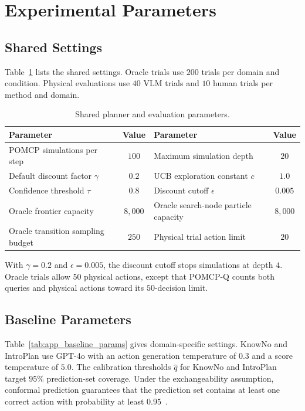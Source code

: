 \section{Experimental Parameters}\label{appx:settings}
\subsection{Shared Settings}\label{appx:planner_params}
Table~\ref{tab:app_planner_params} lists the shared settings. Oracle trials use $200$ trials per domain and condition. Physical evaluations use $40$ VLM trials and $10$ human trials per method and domain.

\begin{table}[!htbp]
\centering
\caption{Shared planner and evaluation parameters.}
\label{tab:app_planner_params}
\small
\begin{tabular*}{\textwidth}{@{\extracolsep{\fill}}lclc@{}}
\toprule
Parameter & Value & Parameter & Value \\
\midrule
POMCP simulations per step & $100$ & Maximum simulation depth & $20$ \\
Default discount factor $\gamma$ & $0.2$ & UCB exploration constant $c$ & $1.0$ \\
Confidence threshold $\tau$ & $0.8$ & Discount cutoff $\epsilon$ & $0.005$ \\
Oracle frontier capacity & $8{,}000$ & Oracle search-node particle capacity & $8{,}000$ \\
Oracle transition sampling budget & $250$ & Physical trial action limit & $20$ \\
\bottomrule
\end{tabular*}
\end{table}
With $\gamma=0.2$ and $\epsilon=0.005$, the discount cutoff stops simulations at depth $4$. Oracle trials allow $50$ physical actions, except that POMCP-Q counts both queries and physical actions toward its $50$-decision limit.

\subsection{Baseline Parameters}\label{appx:baseline_configs}
Table~\ref{tab:app_baseline_params} gives domain-specific settings. KnowNo and IntroPlan use GPT-4o with an action generation temperature of $0.3$ and a score temperature of $5.0$. The calibration thresholds $\hat{q}$ for KnowNo and IntroPlan target $95\%$ prediction-set coverage. Under the exchangeability assumption, conformal prediction guarantees that the prediction set contains at least one correct action with probability at least $0.95$~\citep{ren2023robots}. 

